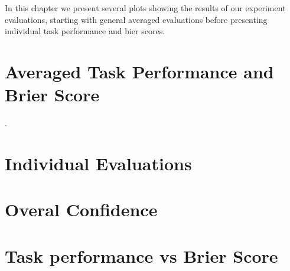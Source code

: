 \documentclass[../main/main.tex]{subfiles}
\begin{document}
In this chapter we present several plots showing the results of our experiment evaluations, starting with general averaged evaluations before presenting individual task performance and bier scores. 
\section{Averaged Task Performance and Brier Score}.
\section{Individual Evaluations}
\section{Overal Confidence}
\section{Task performance vs Brier Score}
\end{document}

